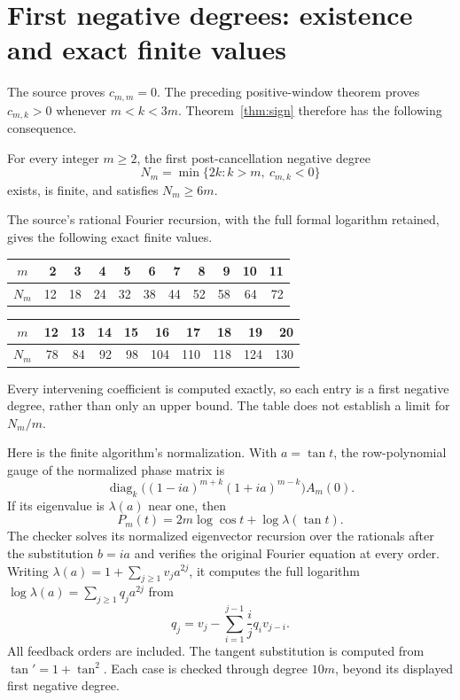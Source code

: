 \documentclass[11pt,a4paper]{article}
\theoremstyle{remark}\newtheorem*{ednote}{Editorial note (ProveIt, 2026-10-01)}
\begin{document}
\section{First negative degrees: existence and exact finite values}\label{sec:finite}
The source proves $c_{m,m}=0$.
The preceding positive-window theorem \cite{Window} proves
$c_{m,k}>0$ whenever $m<k<3m$.
Theorem~\ref{thm:sign} therefore has the following consequence.
\begin{corollary}
For every integer $m\ge2$, the first post-cancellation negative degree
\[
 N_m=\min\{2k:k>m,\ c_{m,k}<0\}
\]
exists, is finite, and satisfies $N_m\ge6m$.
\end{corollary}

The source's rational Fourier recursion, with the full formal logarithm retained, gives the following exact finite values.
\begin{center}
\begin{tabular}{c|rrrrrrrrrr}
$m$&2&3&4&5&6&7&8&9&10&11\\
\hline
$N_m$&12&18&24&32&38&44&52&58&64&72
\end{tabular}

\smallskip
\begin{tabular}{c|rrrrrrrrr}
$m$&12&13&14&15&16&17&18&19&20\\
\hline
$N_m$&78&84&92&98&104&110&118&124&130
\end{tabular}
\end{center}
Every intervening coefficient is computed exactly, so each entry is a first negative degree, rather than only an upper bound.
The table does not establish a limit for $N_m/m$.

Here is the finite algorithm's normalization.
With $a=\tan t$, the row-polynomial gauge of the normalized phase matrix is
\[
 \operatorname{diag}_k\!\bigl((1-ia)^{m+k}(1+ia)^{m-k}\bigr)A_m(0).
\]
If its eigenvalue is $\lambda(a)$ near one, then
\[
 P_m(t)=2m\log\cos t+\log\lambda(\tan t).
\]
The checker solves its normalized eigenvector recursion over the rationals after the substitution $b=ia$ and verifies the original Fourier equation at every order.
Writing $\lambda(a)=1+\sum_{j\ge1}v_j a^{2j}$, it computes the full logarithm
$\log\lambda(a)=\sum_{j\ge1}q_j a^{2j}$ from
\begin{equation}\label{eq:log}
 q_j=v_j-\sum_{i=1}^{j-1}\frac{i}{j}q_i v_{j-i}.
\end{equation}
All feedback orders are included.
The tangent substitution is computed from $\tan'=1+\tan^2$.
Each case is checked through degree $10m$, beyond its displayed first negative degree.
\end{document}
